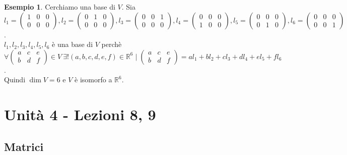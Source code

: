 \documentclass[a4paper]{article}
\theoremstyle{definition}
\newtheorem*{es}{Esempio}
\begin{document}
\begin{es}
	Cerchiamo una base di $V$. Sia $l_1 = \begin{pmatrix} 1 & 0 & 0 \\ 0 & 0 & 0 \end{pmatrix}, l_2 = \begin{pmatrix} 0 & 1 & 0 \\ 0 & 0 & 0 \end{pmatrix}, l_3 = \begin{pmatrix} 0 & 0 & 1 \\ 0 & 0 & 0 \end{pmatrix}, l_4 = \begin{pmatrix} 0 & 0 & 0 \\ 1 & 0 & 0 \end{pmatrix}, l_5 = \begin{pmatrix} 0 & 0 & 0 \\ 0 & 1 & 0 \end{pmatrix}, l_6 = \begin{pmatrix} 0 & 0 & 0 \\ 0 & 0 & 1 \end{pmatrix}$. \\
	$l_1, l_2, l_3, l_4, l_5, l_6$ è una base di $V$ perchè $\forall \begin{pmatrix}
			a & c & e \\
			b & d & f
		\end{pmatrix} \in V \ \exists! (a, b, c, d, e, f) \in \mathbb{R}^6 \mid \begin{pmatrix}
			a & c & e \\
			b & d & f
		\end{pmatrix} = al_1 + bl_2 + cl_3 + dl_4 + el_5 + fl_6$. \\
	Quindi $\dim V = 6$ e $V$ è isomorfo a $\mathbb{R}^6$.
\end{es}
\section{Unità 4 - Lezioni 8, 9}
\subsection{Matrici}
\end{document}
